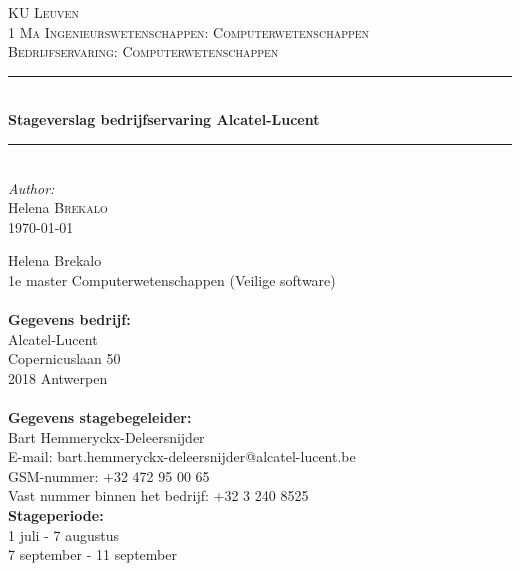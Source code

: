 \documentclass[10pt,a4paper]{article}
\begin{document}
\begin{titlepage}

\newcommand{\HRule}{\rule{\linewidth}{0.5mm}} %

\center %
 
\textsc{\LARGE KU Leuven}\\[1.5cm] %
\textsc{\Large 1 Ma Ingenieurswetenschappen: Computerwetenschappen}\\[0.5cm] %
\textsc{\large Bedrijfservaring: Computerwetenschappen}\\[0.5cm] %


\HRule \\[0.4cm]
{ \huge \bfseries Stageverslag bedrijfservaring Alcatel-Lucent}\\[0.4cm]
\HRule \\[1.5cm]
 

\Large \emph{Author:}\\
Helena \textsc{Brekalo}\\[3cm]

{\large \today}\\[3cm] %

\vfill %

\end{titlepage}

Helena Brekalo\\
1e master Computerwetenschappen (Veilige software)\\
\medskip
\\
\textbf{Gegevens bedrijf:}\\
Alcatel-Lucent\\
Copernicuslaan 50\\
2018 Antwerpen\\
\medskip
\\
\textbf{Gegevens stagebegeleider:}\\
Bart Hemmeryckx-Deleersnijder\\
E-mail: bart.hemmeryckx-deleersnijder@alcatel-lucent.be\\
GSM-nummer: +32 472 95 00 65\\
Vast nummer binnen het bedrijf: +32 3 240 8525
\medskip
\\
\textbf{Stageperiode:}\\
1 juli - 7 augustus\\
7 september - 11 september
\clearpage
\end{document}
